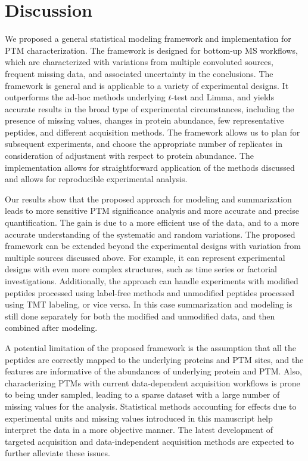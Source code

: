 \documentclass[mcp]{article}
\numberwithin{table}{section}
\begin{document}
\section{Discussion}

We proposed a general statistical modeling framework and implementation for PTM characterization. The framework is designed for bottom-up MS workflows, which are characterized with variations from multiple convoluted sources, frequent missing data, and associated uncertainty in the conclusions. The framework is general and is applicable to a variety of experimental designs. It outperforms the ad-hoc methods underlying $t$-test and Limma, and yields accurate results in the broad type of experimental circumstances, including the presence of missing values, changes in protein abundance, few representative peptides, and different acquisition methods. The framework allows us to plan for subsequent experiments, and choose the appropriate number of replicates in consideration of adjustment with respect to protein abundance. The implementation allows for straightforward application of the methods discussed and allows for reproducible experimental analysis.

Our results show that the proposed approach for modeling and summarization  leads to more sensitive PTM significance analysis and more accurate and precise quantification. The gain is due to a more efficient use of the data, and to a more accurate understanding of the systematic and random variations. The proposed framework can be extended beyond the experimental designs with variation from multiple sources discussed above. For example, it can represent experimental designs with even more complex structures, such as time series or factorial investigations. Additionally, the approach can handle experiments with modified peptides processed using label-free methods and unmodified peptides processed using TMT labeling, or vice versa. In this case summarization and modeling is still done separately for both the modified and unmodified data, and then combined after modeling.

A potential limitation of the proposed framework is the assumption that all the peptides are correctly mapped to the underlying proteins and PTM sites, and the features are informative of the abundances of underlying protein and PTM. Also, characterizing PTMs with current data-dependent acquisition workflows is prone to being under sampled, leading to a sparse dataset with a large number of missing values for the analysis. Statistical methods accounting for effects due to experimental units and missing values introduced in this manuscript help interpret the data in a more objective manner. The latest development of targeted acquisition and data-independent acquisition methods are expected to further alleviate these issues. 
\end{document}

